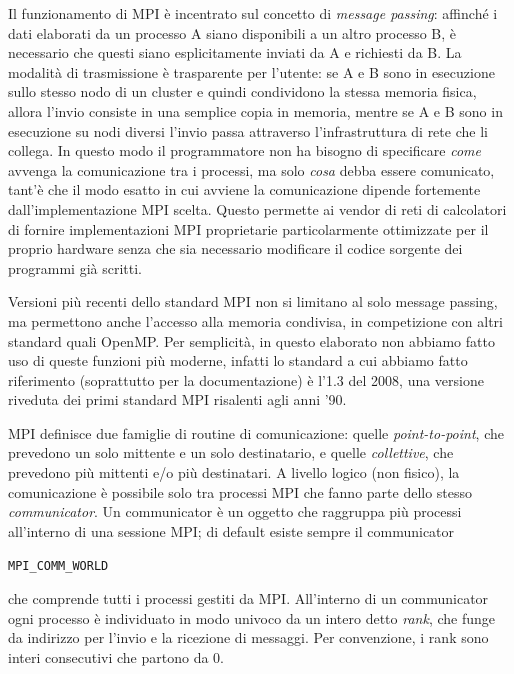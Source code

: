 \documentclass[a4paper,11pt]{article}
\newcommand{\code}[1]{\begin{small}\texttt{#1}\end{small}}
\begin{document}
Il funzionamento di MPI è incentrato sul concetto di
\emph{message passing}: affinché i dati elaborati da un
processo A siano disponibili a un altro processo B, è necessario
che questi siano esplicitamente inviati da A e richiesti da B.
La modalità di trasmissione è trasparente per l'utente:
se A e B sono in esecuzione sullo stesso nodo di un cluster
e quindi condividono la stessa memoria fisica, allora
l'invio consiste in una semplice copia in memoria, mentre
se A e B sono in esecuzione su nodi diversi l'invio
passa attraverso l'infrastruttura di rete che li collega.
%
In questo modo il programmatore non ha bisogno di specificare
\emph{come} avvenga la comunicazione tra i processi, ma
solo \emph{cosa} debba essere comunicato, tant'è che il modo
esatto in cui avviene la comunicazione dipende fortemente
dall'implementazione MPI scelta.
Questo permette ai vendor di reti di calcolatori
di fornire implementazioni MPI proprietarie
particolarmente ottimizzate per il proprio hardware
senza che sia necessario modificare il codice sorgente
dei programmi già scritti.

Versioni più recenti dello standard MPI non si limitano
al solo message passing, ma permettono anche l'accesso
alla memoria condivisa, in competizione con altri
standard quali OpenMP. Per semplicità, in questo elaborato
non abbiamo fatto uso di queste funzioni più moderne, infatti
lo standard a cui abbiamo fatto riferimento (soprattutto per la
documentazione) è l'1.3 del 2008, una versione riveduta
dei primi standard MPI risalenti agli anni '90.

MPI definisce due famiglie di routine di comunicazione:
quelle \emph{point-to-point}, che prevedono un solo mittente
e un solo destinatario, e quelle \emph{collettive}, che
prevedono più mittenti e/o più destinatari.
A livello logico (non fisico), la comunicazione è
possibile solo tra processi MPI che fanno parte dello
stesso \emph{communicator}. Un communicator è un oggetto
che raggruppa più processi all'interno di una sessione MPI;
di default esiste sempre il communicator \code{MPI\_COMM\_WORLD}
che comprende tutti i processi gestiti da MPI.
All'interno di un communicator ogni processo è individuato
in modo univoco da un intero detto \emph{rank}, che funge
da indirizzo per l'invio e la ricezione di messaggi.
Per convenzione, i rank sono interi consecutivi che partono da 0.
\end{document}
